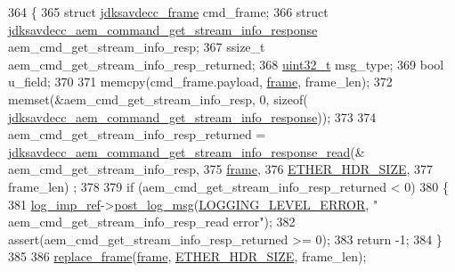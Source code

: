 \begin{DoxyCode}
364 \{
365     \textcolor{keyword}{struct }\hyperlink{structjdksavdecc__frame}{jdksavdecc\_frame} cmd\_frame;
366     \textcolor{keyword}{struct }\hyperlink{structjdksavdecc__aem__command__get__stream__info__response}{jdksavdecc\_aem\_command\_get\_stream\_info\_response} 
      aem\_cmd\_get\_stream\_info\_resp;
367     ssize\_t aem\_cmd\_get\_stream\_info\_resp\_returned;
368     \hyperlink{parse_8c_a6eb1e68cc391dd753bc8ce896dbb8315}{uint32\_t} msg\_type;
369     \textcolor{keywordtype}{bool} u\_field;
370 
371     memcpy(cmd\_frame.payload, \hyperlink{gst__avb__playbin_8c_ac8e710e0b5e994c0545d75d69868c6f0}{frame}, frame\_len);
372     memset(&aem\_cmd\_get\_stream\_info\_resp, 0, \textcolor{keyword}{sizeof}(
      \hyperlink{structjdksavdecc__aem__command__get__stream__info__response}{jdksavdecc\_aem\_command\_get\_stream\_info\_response}));
373 
374     aem\_cmd\_get\_stream\_info\_resp\_returned = 
      \hyperlink{group__command__get__stream__info__response_ga4bcf5e9c7ef91a7dfc11835f94bf9667}{jdksavdecc\_aem\_command\_get\_stream\_info\_response\_read}(&
      aem\_cmd\_get\_stream\_info\_resp,
375                                                                                                  
      \hyperlink{gst__avb__playbin_8c_ac8e710e0b5e994c0545d75d69868c6f0}{frame},
376                                                                                                  
      \hyperlink{namespaceavdecc__lib_a6c827b1a0d973e18119c5e3da518e65ca9512ad9b34302ba7048d88197e0a2dc0}{ETHER\_HDR\_SIZE},
377                                                                                                  frame\_len)
      ;
378 
379     \textcolor{keywordflow}{if} (aem\_cmd\_get\_stream\_info\_resp\_returned < 0)
380     \{
381         \hyperlink{namespaceavdecc__lib_acbe3e2a96ae6524943ca532c87a28529}{log\_imp\_ref}->\hyperlink{classavdecc__lib_1_1log_a68139a6297697e4ccebf36ccfd02e44a}{post\_log\_msg}(\hyperlink{namespaceavdecc__lib_a501055c431e6872ef46f252ad13f85cdaf2c4481208273451a6f5c7bb9770ec8a}{LOGGING\_LEVEL\_ERROR}, \textcolor{stringliteral}{"
      aem\_cmd\_get\_stream\_info\_resp\_read error"});
382         assert(aem\_cmd\_get\_stream\_info\_resp\_returned >= 0);
383         \textcolor{keywordflow}{return} -1;
384     \}
385 
386     \hyperlink{classavdecc__lib_1_1descriptor__base__imp_a482fe95208e9e14885e28e73e7be2c49}{replace\_frame}(\hyperlink{gst__avb__playbin_8c_ac8e710e0b5e994c0545d75d69868c6f0}{frame}, \hyperlink{namespaceavdecc__lib_a6c827b1a0d973e18119c5e3da518e65ca9512ad9b34302ba7048d88197e0a2dc0}{ETHER\_HDR\_SIZE}, frame\_len);

\end{DoxyCode}
